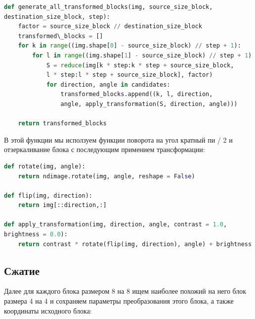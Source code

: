 \documentclass{article}
\begin{document}
\begin{lstlisting}[language=Python]
def generate_all_transformed_blocks(img, source_size_block, 
destination_size_block, step):
	factor = source_size_block // destination_size_block
	transformed\_blocks = []
	for k in range((img.shape[0] - source_size_block) // step + 1):
		for l in range((img.shape[1] - source_size_block) // step + 1):
			S = reduce(img[k * step:k * step + source_size_block,
			l * step:l * step + source_size_block], factor)
			for direction, angle in candidates:
				transformed_blocks.append((k, l, direction, 
				angle, apply_transformation(S, direction, angle)))

	return transformed_blocks
\end{lstlisting}
\vspace{1em}

В этой функции мы исползуем функции поворота на угол кратный пи / 2 и отзеркаливание блока с последующим примением трансформации:

\begin{lstlisting}[language=Python]
def rotate(img, angle):
	return ndimage.rotate(img, angle, reshape = False)

def flip(img, direction):
	return img[::direction,:]

def apply_transformation(img, direction, angle, contrast = 1.0, 
brightness = 0.0):
	return contrast * rotate(flip(img, direction), angle) + brightness
\end{lstlisting}
\vspace{1em}

\subsection{Сжатие}

Далее для каждого блока размером 8 на 8 ищем наиболее похожий на него блок размера 4 на 4 и сохраняем параметры преобразования этого блока, а также координаты исходного блока:
\end{document}
